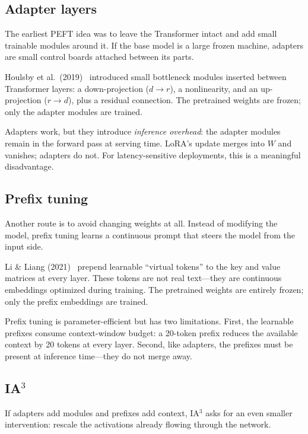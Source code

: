 \subsection{Adapter layers}

The earliest PEFT idea was to leave the Transformer intact and add small trainable modules around it. If the base model is a large frozen machine, adapters are small control boards attached between its parts.

Houlsby et al.\ (2019)~\cite{houlsby2019adapters} introduced small bottleneck modules inserted between Transformer layers: a down-projection ($d \to r$), a nonlinearity, and an up-projection ($r \to d$), plus a residual connection. The pretrained weights are frozen; only the adapter modules are trained.

Adapters work, but they introduce \emph{inference overhead}: the adapter modules remain in the forward pass at serving time. LoRA's update merges into $W$ and vanishes; adapters do not. For latency-sensitive deployments, this is a meaningful disadvantage.

\subsection{Prefix tuning}

Another route is to avoid changing weights at all. Instead of modifying the model, prefix tuning learns a continuous prompt that steers the model from the input side.

Li \& Liang (2021)~\cite{li2021prefix} prepend learnable ``virtual tokens'' to the key and value matrices at every layer. These tokens are not real text---they are continuous embeddings optimized during training. The pretrained weights are entirely frozen; only the prefix embeddings are trained.

Prefix tuning is parameter-efficient but has two limitations. First, the learnable prefixes consume context-window budget: a 20-token prefix reduces the available context by 20 tokens at every layer. Second, like adapters, the prefixes must be present at inference time---they do not merge away.

\subsection{\texorpdfstring{IA$^3$}{IA3}}

If adapters add modules and prefixes add context, IA$^3$ asks for an even smaller intervention: rescale the activations already flowing through the network.

